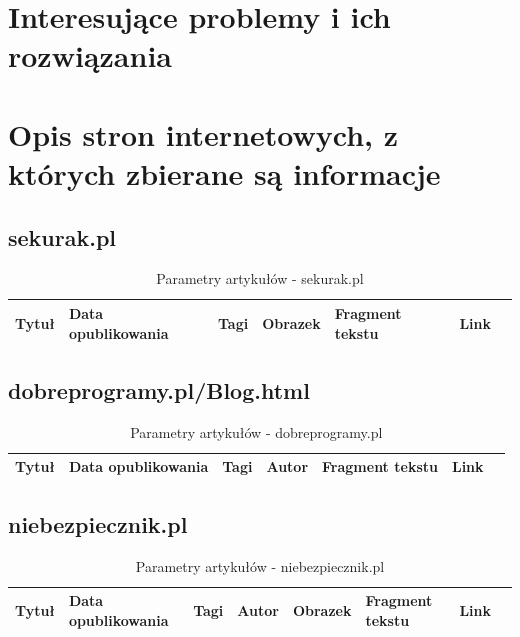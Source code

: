 \documentclass[12pt, titlepage]{article}
\begin{document}
	\section{Interesujące problemy i ich rozwiązania}
	
	\section{Opis stron internetowych, z których zbierane są informacje}
	\renewcommand\thesubsection{}
		\subsection{sekurak.pl}
		\begin{table}[H]
			\centering
			\caption{Parametry artykułów - sekurak.pl}
			\label{sekurak_parametry}
			\begin{tabular}{ | C{2cm} | C{4cm} | C{2cm} | C{2cm} | C{3cm} | C{2cm} | @{}m{0pt}@{}}
				\hline
				Tytuł & Data opublikowania & Tagi & Obrazek & Fragment tekstu & Link &\\[0.5cm]
				\hline
			\end{tabular}
		\end{table}

		\subsection{dobreprogramy.pl/Blog.html} 
		\begin{table}[H]
			\centering
			\caption{Parametry artykułów - dobreprogramy.pl}
			\label{dobreprogramy_parametry}
			\begin{tabular}{ | C{2cm} | C{4cm} | C{2cm} | C{2cm} | C{3cm} | C{2cm} | @{}m{0pt}@{}}
				\hline
				Tytuł & Data opublikowania & Tagi & Autor & Fragment tekstu & Link &\\[0.5cm]
				\hline
			\end{tabular}
		\end{table}
		\subsection{niebezpiecznik.pl} 
		\begin{table}[H]
			\centering
			\caption{Parametry artykułów - niebezpiecznik.pl}
			\label{niebezpiecznik_parametry}
			\begin{tabular}{ | C{1.5cm} | C{4cm} | C{1.5cm} | C{1.5cm} | C{1.5cm} | C{3cm} | C{1.5cm} | @{}m{0pt}@{}}
				\hline
				Tytuł & Data opublikowania & Tagi & Autor & Obrazek & Fragment tekstu & Link &\\[0.5cm]
				\hline
			\end{tabular}
		\end{table}
\end{document}
